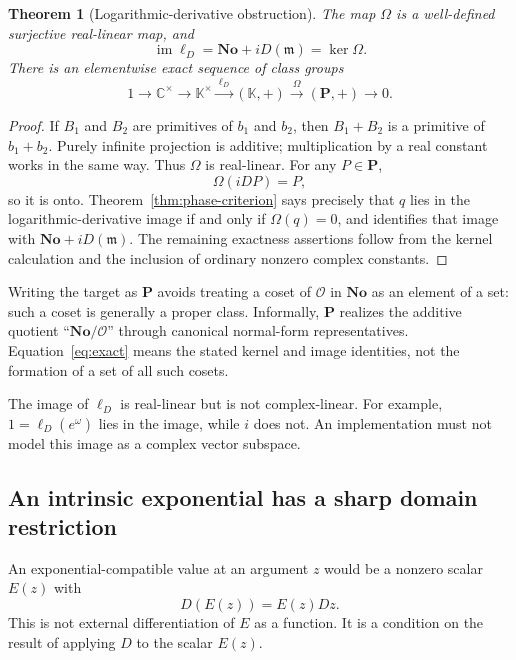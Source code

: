 \documentclass[11pt,a4paper]{article}
\numberwithin{equation}{section}
\newtheorem{theorem}{Theorem}[section]
\theoremstyle{definition}
\theoremstyle{remark}
\newcommand{\No}{\mathbf{No}}
\newcommand{\K}{\mathbb K}
\newcommand{\C}{\mathbb C}
\newcommand{\OO}{\mathcal O}
\newcommand{\mm}{\mathfrak m}
\newcommand{\PP}{\mathbf P}
\newcommand{\im}{\operatorname{im}}
\newcommand{\Dlog}{\ell_D}
\begin{document}
\begin{theorem}[Logarithmic-derivative obstruction]\label{thm:exact}
The map $\Omega$ is a well-defined surjective real-linear map, and
\begin{equation}\label{eq:ld-image}
 \im\Dlog=\No+iD(\mm)=\ker\Omega.
\end{equation}
There is an elementwise exact sequence of class groups
\begin{equation}\label{eq:exact}
 1\longrightarrow\C^\times\longrightarrow\K^\times
 \xrightarrow{\ \Dlog\ }(\K,+)
 \xrightarrow{\ \Omega\ }(\PP,+)\longrightarrow0.
\end{equation}
\end{theorem}
\begin{proof}
If $B_1$ and $B_2$ are primitives of $b_1$ and $b_2$, then
$B_1+B_2$ is a primitive of $b_1+b_2$. Purely infinite projection is
additive; multiplication by a real constant works in the same way. Thus
$\Omega$ is real-linear. For any $P\in\PP$,
\[
 \Omega(iDP)=P,
\]
so it is onto. Theorem~\ref{thm:phase-criterion} says precisely that
$q$ lies in the logarithmic-derivative image if and only if
$\Omega(q)=0$, and identifies that image with
$\No+iD(\mm)$. The remaining exactness assertions follow from the kernel
calculation and the inclusion of ordinary nonzero complex constants.
\end{proof}

Writing the target as $\PP$ avoids treating a coset of $\OO$ in $\No$ as
an element of a set: such a coset is generally a proper class. Informally,
$\PP$ realizes the additive quotient ``$\No/\OO$'' through canonical
normal-form representatives. Equation~\eqref{eq:exact} means the stated
kernel and image identities, not the formation of a set of all such cosets.

The image of $\Dlog$ is real-linear but is not complex-linear. For example,
$1=\Dlog(e^\omega)$ lies in the image, while $i$ does not. An implementation
must not model this image as a complex vector subspace.

\subsection{An intrinsic exponential has a sharp domain restriction}

An exponential-compatible value at an argument $z$ would be a nonzero scalar
$E(z)$ with
\begin{equation}\label{eq:intrinsic-exp-law}
 D(E(z))=E(z)Dz.
\end{equation}
This is not external differentiation of $E$ as a function. It is a condition
on the result of applying $D$ to the scalar $E(z)$.
\end{document}
